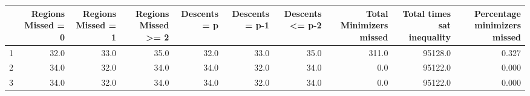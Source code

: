 \begin{tabular}{lrrrrrrrrr}
\toprule
{} &  Regions Missed = 0 &  Regions Missed = 1 &  Regions Missed >= 2 &  Descents = p &  Descents = p-1 &  Descents <= p-2 &  Total Minimizers missed &  Total times sat inequality &  Percentage minimizers missed \\
\midrule
1 &                32.0 &                33.0 &                 35.0 &          32.0 &            33.0 &             35.0 &                    311.0 &                     95128.0 &                         0.327 \\
2 &                34.0 &                32.0 &                 34.0 &          34.0 &            32.0 &             34.0 &                      0.0 &                     95122.0 &                         0.000 \\
3 &                34.0 &                32.0 &                 34.0 &          34.0 &            32.0 &             34.0 &                      0.0 &                     95122.0 &                         0.000 \\
\bottomrule
\end{tabular}
